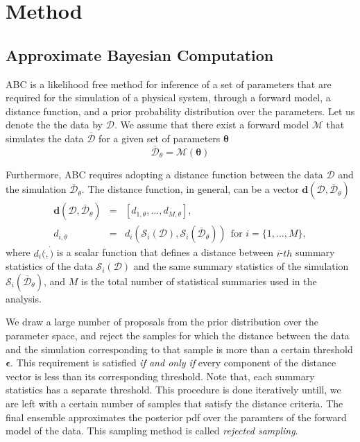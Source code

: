 \documentclass[12pt, preprint]{aastex}
\newcommand{\beq}{\begin{equation}}
\newcommand{\eeq}{\end{equation}}
\begin{document}
\section{Method}

\subsection{Approximate Bayesian Computation}

ABC is a likelihood free method for inference of a set of parameters that are required for the simulation of a 
physical system, through a forward model, a distance function, and a prior probability distribution over the parameters. 
Let us denote the the data by $\mathcal{D}$. We assume that there exist a forward model $\mathcal{M}$ that 
simulates the data $\bar{\mathcal{D}}$ for a given set of parameters $\bm{\theta}$
\beq
\bar{\mathcal{D}}_{\theta} = \mathcal{M}(\bm{\theta})
\eeq

Furthermore, ABC requires adopting a distance function between the data $\mathcal{D}$ and the simulation $\bar{\mathcal{D}}_{\theta}$.
The distance function, in general, can be a vector $\bm{d}(\mathcal{D},\bar{\mathcal{D}}_{\theta})$
\begin{eqnarray}
\bm{d}(\mathcal{D},\bar{\mathcal{D}}_{\theta}) &=& [d_{1,\theta}, ... , d_{M,\theta}], \\
d_{i,\theta} &=& d_{i}(\mathcal{S}_{i}(\mathcal{D}), \mathcal{S}_{i}(\bar{\mathcal{D}}_{\theta}))  ~~\mbox{for $i=\{1,...,M\}$},
\end{eqnarray}
where $d_{i}(\dot,\dot)$ is a scalar function that defines a distance 
between $i$-$th$ summary statistics of the data $\mathcal{S}_{i}(\mathcal{D})$ and the same summary statistics of 
the simulation $\mathcal{S}_{i}(\bar{\mathcal{D}}_{\theta})$, and $M$ is the total number of statistical summaries 
used in the analysis.

We draw a large number of proposals from the prior distribution over the parameter space, 
and reject the samples for which the distance between the data and the simulation corresponding to that 
sample is more than a certain threshold $\bm{\epsilon}$. This requirement is satisfied \emph{if and only if}
every component of the distance vector is less than its corresponding threshold. Note that, each summary statistics 
has a separate threshold. This procedure is done iteratively untill, we are left with a certain number
of samples that satisfy the distance criteria. The final ensemble approximates the posterior pdf over 
the paramters of the forward model of the data. This sampling method is called \emph{rejected sampling}.
\end{document}
